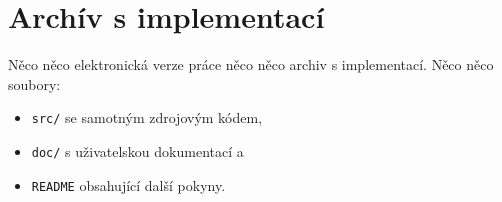 \chapter{Archív s implementací}

Něco něco elektronická verze práce\footnotemark{}
něco něco archiv s implementací. Něco něco soubory:

\begin{itemize}
    \item \texttt{src/} se samotným zdrojovým kódem,
    \item \texttt{doc/} s uživatelskou dokumentací a
    \item \texttt{README} obsahující další pokyny.
\end{itemize}


